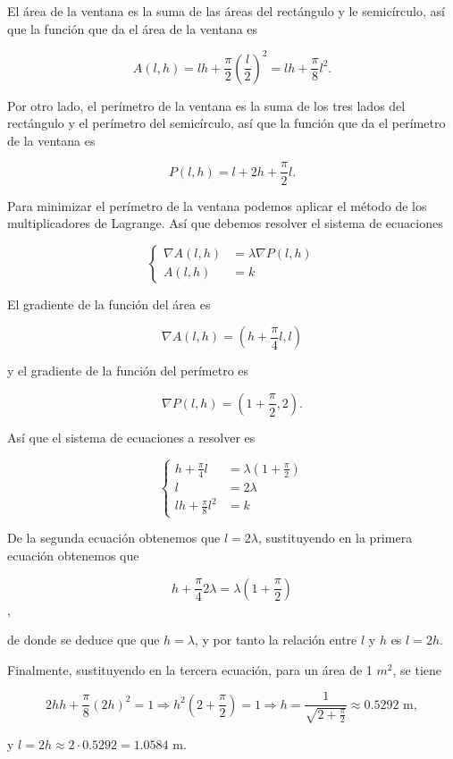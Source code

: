 \documentclass[
  a4paper,
]{scrreport}
\theoremstyle{definition}
\theoremstyle{remark}
\begin{document}
\begin{tcolorbox}[enhanced jigsaw, opacityback=0, colframe=quarto-callout-tip-color-frame, colbacktitle=quarto-callout-tip-color!10!white, titlerule=0mm, bottomtitle=1mm, rightrule=.15mm, arc=.35mm, left=2mm, coltitle=black, title=\textcolor{quarto-callout-tip-color}{\faLightbulb}\hspace{0.5em}{Solución}, bottomrule=.15mm, opacitybacktitle=0.6, breakable, toptitle=1mm, leftrule=.75mm, toprule=.15mm, colback=white]

El área de la ventana es la suma de las áreas del rectángulo y le
semicírculo, así que la función que da el área de la ventana es

\[
A(l,h)=lh+\frac{\pi}{2}\left(\frac{l}{2}\right)^2 = lh + \frac{\pi}{8}l^2.
\]

Por otro lado, el perímetro de la ventana es la suma de los tres lados
del rectángulo y el perímetro del semicírculo, así que la función que da
el perímetro de la ventana es

\[
P(l,h)=l+2h+\frac{\pi}{2}l.
\]

Para minimizar el perímetro de la ventana podemos aplicar el método de
los multiplicadores de Lagrange. Así que debemos resolver el sistema de
ecuaciones

\[
\begin{cases}
\nabla A(l,h) &= \lambda \nabla P(l,h) \\
A(l,h) &= k
\end{cases}
\]

El gradiente de la función del área es

\[
\nabla A(l,h) = \left( h + \frac{\pi}{4}l,  l\right)
\]

y el gradiente de la función del perímetro es

\[
\nabla P(l,h) = \left( 1 + \frac{\pi}{2}, 2\right).
\]

Así que el sistema de ecuaciones a resolver es

\[
\begin{cases}
h + \frac{\pi}{4}l &= \lambda \left( 1 + \frac{\pi}{2}\right) \\
l &= 2\lambda \\
lh + \frac{\pi}{8}l^2 &= k
\end{cases}
\]

De la segunda ecuación obtenemos que \(l=2\lambda\), sustituyendo en la
primera ecuación obtenemos que

\[
h + \frac{\pi}{4}2\lambda = \lambda \left( 1 + \frac{\pi}{2}\right)
\],

de donde se deduce que que \(h = \lambda\), y por tanto la relación
entre \(l\) y \(h\) es \(l=2h\).

Finalmente, sustituyendo en la tercera ecuación, para un área de 1
\(m^2\), se tiene

\[
2hh + \frac{\pi}{8}(2h)^2 = 1 
\Rightarrow h^2\left( 2 + \frac{\pi}{2}\right) = 1 
\Rightarrow h = \frac{1}{\sqrt{2 + \frac{\pi}{2}}}
\approx 0.5292 \mbox{ m},
\]

y \(l = 2h \approx 2\cdot 0.5292 = 1.0584\) m.

\end{tcolorbox}
\end{document}

